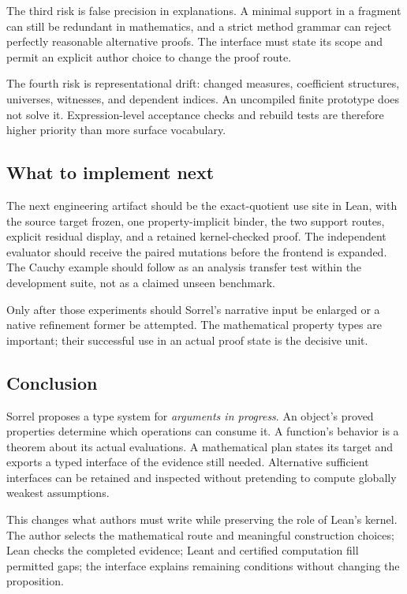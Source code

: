 \documentclass[11pt,a4paper]{article}
\numberwithin{equation}{section}
\theoremstyle{definition}\newtheorem{definition}[theorem]{Definition}
\theoremstyle{remark}\newtheorem{remark}[theorem]{Remark}
\begin{document}
The third risk is false precision in explanations. A minimal support in a
fragment can still be redundant in mathematics, and a strict method grammar
can reject perfectly reasonable alternative proofs. The interface must state
its scope and permit an explicit author choice to change the proof route.

The fourth risk is representational drift: changed measures, coefficient
structures, universes, witnesses, and dependent indices. An uncompiled
finite prototype does not solve it. Expression-level acceptance checks and
rebuild tests are therefore higher priority than more surface vocabulary.

\subsection{What to implement next}
The next engineering artifact should be the exact-quotient use site in Lean,
with the source target frozen, one property-implicit binder, the two support
routes, explicit residual display, and a retained kernel-checked proof. The
independent evaluator should receive the paired mutations before the frontend
is expanded. The Cauchy example should follow as an analysis transfer test
within the development suite, not as a claimed unseen benchmark.

Only after those experiments should Sorrel's narrative input be enlarged or
a native refinement former be attempted. The mathematical property types are
important; their successful use in an actual proof state is the decisive unit.

\subsection{Conclusion}
Sorrel proposes a type system for \emph{arguments in progress}. An object's
proved properties determine which operations can consume it. A function's
behavior is a theorem about its actual evaluations. A mathematical plan
states its target and exports a typed interface of the evidence still needed.
Alternative sufficient interfaces can be retained and inspected without
pretending to compute globally weakest assumptions.

This changes what authors must write while preserving the role of Lean's
kernel. The author selects the mathematical route and meaningful construction
choices; Lean checks the completed evidence; Leant and certified computation
fill permitted gaps; the interface explains remaining conditions without
changing the proposition.
\end{document}
